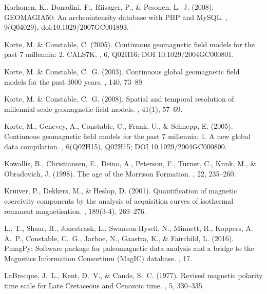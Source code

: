 Korhonen, K., Donadini, F., Riisager, P., \& Pesonen, L.~J. (2008).
\newblock GEOMAGIA50: An archeointensity database with PHP and MySQL.
, 9(Q04029),
  doi:10.1029/2007GC001893.

Korte, M. \& Constable, C. (2005).
\newblock Continuous geomagnetic field models for the past 7 millennia: 2.
  CALS7K.
, 6, Q02H16: DOI
  10.1029/2004GC000801.

Korte, M. \& Constable, C.~G. (2003).
\newblock Continuous global geomagnetic field models for the past 3000 years.
, 140, 73--89.

Korte, M. \& Constable, C.~G. (2008).
\newblock Spatial and temporal resolution of millennial scale geomagnetic field
  models.
, 41(1), 57--69.

Korte, M., Genevey, A., Constable, C., Frank, U., \& Schnepp, E. (2005).
\newblock Continuous geomagnetic field models for the past 7 millennia: 1. A
  new global data compilation.
, 6(Q02H15), Q02H15; DOI
  10.1029/2004GC000800.

Kowallis, B., Christiansen, E., Deino, A., Peterson, F., Turner, C., Kunk, M.,
  \& Obradovich, J. (1998).
\newblock The age of the Morrison Formation.
, 22, 235--260.

Kruiver, P., Dekkers, M., \& Heslop, D. (2001).
\newblock Quantification of magnetic coercivity components by the analysis of
  acquisition curves of isothermal remanent magnetisation.
, 189(3-4), 269--276.

L., T., Shaar, R., Jonestrask, L., Swanson-Hysell, N., Minnett, R., Koppers, A.
  A.~P., Constable, C.~G., Jarboe, N., Gaastra, K., \& Fairchild, L. (2016).
\newblock PmagPy: Software package for paleomagnetic data analysis and a bridge
  to the Magnetics Information Consortium (MagIC) database.
, 17.

LaBrecque, J.~L., Kent, D.~V., \& Cande, S.~C. (1977).
\newblock Revised magnetic polarity time scale for Late Cretaceous and Cenozoic
  time.
, 5, 330--335.

